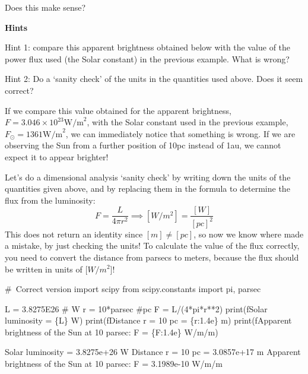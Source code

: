 \documentclass[
  letterpaper,
  DIV=11,
  numbers=noendperiod]{scrartcl}
\newenvironment{Shaded}{\begin{snugshade}}{\end{snugshade}}
\newcommand{\BuiltInTok}[1]{\textcolor[rgb]{0.00,0.23,0.31}{#1}}
\newcommand{\CommentTok}[1]{\textcolor[rgb]{0.37,0.37,0.37}{#1}}
\newcommand{\DecValTok}[1]{\textcolor[rgb]{0.68,0.00,0.00}{#1}}
\newcommand{\FloatTok}[1]{\textcolor[rgb]{0.68,0.00,0.00}{#1}}
\newcommand{\ImportTok}[1]{\textcolor[rgb]{0.00,0.46,0.62}{#1}}
\newcommand{\NormalTok}[1]{\textcolor[rgb]{0.00,0.23,0.31}{#1}}
\newcommand{\OperatorTok}[1]{\textcolor[rgb]{0.37,0.37,0.37}{#1}}
\newcommand{\SpecialCharTok}[1]{\textcolor[rgb]{0.37,0.37,0.37}{#1}}
\newcommand{\SpecialStringTok}[1]{\textcolor[rgb]{0.13,0.47,0.30}{#1}}
\begin{document}
Does this make sense?

\textbf{Hints}

Hint 1: compare this apparent brightness obtained below with the value
of the power flux used (the Solar constant) in the previous example.
What is wrong?

Hint 2: Do a `sanity check' of the units in the quantities used above.
Does it seem correct?

If we compare this value obtained for the apparent brightness,
\(F=3.046\times 10^{23} \mathrm{W/m}^2\), with the Solar constant used
in the previous example, \(F_\odot = 1361 \mathrm{W/m}^2\), we can
immediately notice that something is wrong. If we are observing the Sun
from a further position of 10pc instead of 1au, we cannot expect it to
appear brighter!

Let's do a dimensional analysis `sanity check' by writing down the units
of the quantities given above, and by replacing them in the formula to
determine the flux from the luminosity:
\[ F=\frac{L}{4\pi r^2} \implies [W/m^2] = \frac{[W]}{[pc]^2} \] This
does not return an identity since \([m]\neq [pc]\), so now we know where
made a mistake, by just checking the units! To calculate the value of
the flux correctly, you need to convert the distance from parsecs to
meters, because the flux should be written in units of {[}\(W/m^2\){]}!

\begin{Shaded}
\begin{Highlighting}[]
\CommentTok{\# Correct version}
\ImportTok{import}\NormalTok{ scipy}
\ImportTok{from}\NormalTok{ scipy.constants }\ImportTok{import}\NormalTok{ pi, parsec}

\NormalTok{L }\OperatorTok{=} \FloatTok{3.8275E26} \CommentTok{\# W}
\NormalTok{r }\OperatorTok{=} \DecValTok{10}\OperatorTok{*}\NormalTok{parsec }\CommentTok{\#pc}
\NormalTok{F }\OperatorTok{=}\NormalTok{ L}\OperatorTok{/}\NormalTok{(}\DecValTok{4}\OperatorTok{*}\NormalTok{pi}\OperatorTok{*}\NormalTok{r}\OperatorTok{**}\DecValTok{2}\NormalTok{)}
\BuiltInTok{print}\NormalTok{(}\SpecialStringTok{f\textquotesingle{}Solar luminosity = }\SpecialCharTok{\{}\NormalTok{L}\SpecialCharTok{\}}\SpecialStringTok{ W\textquotesingle{}}\NormalTok{)}
\BuiltInTok{print}\NormalTok{(}\SpecialStringTok{f\textquotesingle{}Distance r = 10 pc = }\SpecialCharTok{\{}\NormalTok{r}\SpecialCharTok{:1.4e\}}\SpecialStringTok{ m\textquotesingle{}}\NormalTok{)}
\BuiltInTok{print}\NormalTok{(}\SpecialStringTok{f\textquotesingle{}Apparent brightness of the Sun at 10 parsec: F = }\SpecialCharTok{\{}\NormalTok{F}\SpecialCharTok{:1.4e\}}\SpecialStringTok{ W/m/m\textquotesingle{}}\NormalTok{)}

\NormalTok{Solar luminosity }\OperatorTok{=} \FloatTok{3.8275e+26}\NormalTok{ W}
\NormalTok{Distance r }\OperatorTok{=} \DecValTok{10}\NormalTok{ pc }\OperatorTok{=} \FloatTok{3.0857e+17}\NormalTok{ m}
\NormalTok{Apparent brightness of the Sun at }\DecValTok{10}\NormalTok{ parsec: F }\OperatorTok{=} \FloatTok{3.1989e{-}10}\NormalTok{ W}\OperatorTok{/}\NormalTok{m}\OperatorTok{/}\NormalTok{m}
\end{Highlighting}
\end{Shaded}
\end{document}
